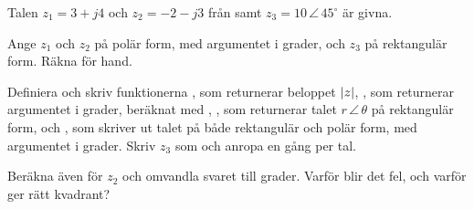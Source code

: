 Talen $z_1 = 3 + j4$ och $z_2 = -2 - j3$ från  samt
$z_3 = 10\,\angle\,45^{\circ}$ är givna.
\begin{parts}
  \item Ange $z_1$ och $z_2$ på polär form, med argumentet i grader, och $z_3$ på rektangulär
    form. Räkna för hand.
  \item Definiera  och skriv funktionerna , som returnerar beloppet $\lvert z\rvert$, , som returnerar argumentet i grader, beräknat med ,
    , som returnerar talet
    $r\,\angle\,\theta$ på rektangulär form, och , som
    skriver ut talet på både rektangulär och polär form, med argumentet i grader. Skriv $z_3$ som
     och anropa  en gång per tal.
  \item Beräkna även  för $z_2$ och omvandla svaret till grader. Varför
    blir det fel, och varför ger  rätt kvadrant?
\end{parts}
